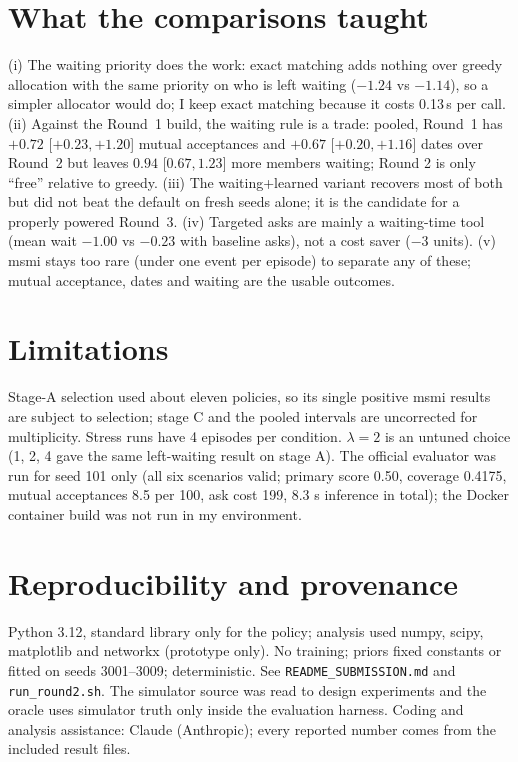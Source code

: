 \documentclass[10pt,a4paper]{article}
\begin{document}
\section{What the comparisons taught}
(i) The waiting priority does the work: exact matching adds nothing over greedy allocation with the same priority on who is left waiting ($-1.24$ vs $-1.14$), so a simpler allocator would do; I keep exact matching because it costs 0.13\,s per call. (ii) Against the Round~1 build, the waiting rule is a trade: pooled, Round~1 has $+0.72$ [$+0.23,+1.20$] mutual acceptances and $+0.67$ [$+0.20,+1.16$] dates over Round~2 but leaves $0.94$ [$0.67,1.23$] more members waiting; Round 2 is only ``free'' relative to greedy. (iii) The waiting+learned variant recovers most of both but did not beat the default on fresh seeds alone; it is the candidate for a properly powered Round~3. (iv) Targeted asks are mainly a waiting-time tool (mean wait $-1.00$ vs $-0.23$ with baseline asks), not a cost saver ($-3$ units). (v) msmi stays too rare (under one event per episode) to separate any of these; mutual acceptance, dates and waiting are the usable outcomes.

\section{Limitations}
Stage-A selection used about eleven policies, so its single positive msmi results are subject to selection; stage C and the pooled intervals are uncorrected for multiplicity. Stress runs have 4 episodes per condition. $\lambda=2$ is an untuned choice (1, 2, 4 gave the same left-waiting result on stage A). The official evaluator was run for seed 101 only (all six scenarios valid; primary score 0.50, coverage 0.4175, mutual acceptances 8.5 per 100, ask cost 199, 8.3 s inference in total); the Docker container build was not run in my environment.

\section{Reproducibility and provenance}
Python 3.12, standard library only for the policy; analysis used numpy, scipy, matplotlib and networkx (prototype only). No training; priors fixed constants or fitted on seeds 3001--3009; deterministic. See \texttt{README\_SUBMISSION.md} and \texttt{run\_round2.sh}. The simulator source was read to design experiments and the oracle uses simulator truth only inside the evaluation harness. Coding and analysis assistance: Claude (Anthropic); every reported number comes from the included result files.
\end{document}
